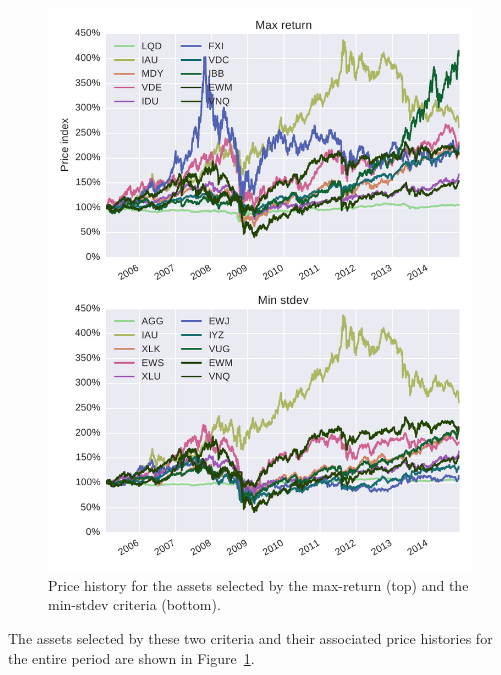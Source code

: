 \begin{figure}[tp]
\centering
\includegraphics{../pic/prices_selected_assets.pdf}
\caption{Price history for the assets selected by the max-return (top) and the min-stdev criteria (bottom).}
\label{fig:prices_selected}
\end{figure}

The assets selected by these two criteria and their associated price histories for the entire period are shown in Figure~\ref{fig:prices_selected}.